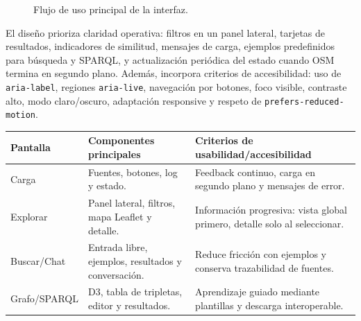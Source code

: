 \documentclass[10pt,a4paper]{article}
\begin{document}
\begin{figure}[H]
\centering
{}
\caption{Flujo de uso principal de la interfaz.}
\end{figure}

\clearpage

El diseño prioriza claridad operativa: filtros en un panel lateral, tarjetas de resultados, indicadores de similitud, mensajes de carga, ejemplos predefinidos para búsqueda y SPARQL, y actualización periódica del estado cuando OSM termina en segundo plano. Además, incorpora criterios de accesibilidad: uso de \texttt{aria-label}, regiones \texttt{aria-live}, navegación por botones, foco visible, contraste alto, modo claro/oscuro, adaptación responsive y respeto de \texttt{prefers-reduced-motion}.

\begin{table}[H]
\centering
\scriptsize
\begin{tabularx}{\textwidth}{p{2.5cm}X X}
\toprule
\textbf{Pantalla} & \textbf{Componentes principales} & \textbf{Criterios de usabilidad/accesibilidad}\\
\midrule
Carga & Fuentes, botones, log y estado. & Feedback continuo, carga en segundo plano y mensajes de error.\\
Explorar & Panel lateral, filtros, mapa Leaflet y detalle. & Información progresiva: vista global primero, detalle solo al seleccionar.\\
Buscar/Chat & Entrada libre, ejemplos, resultados y conversación. & Reduce fricción con ejemplos y conserva trazabilidad de fuentes.\\
Grafo/SPARQL & D3, tabla de tripletas, editor y resultados. & Aprendizaje guiado mediante plantillas y descarga interoperable.\\
\bottomrule
\end{tabularx}
\end{table}
\end{document}
